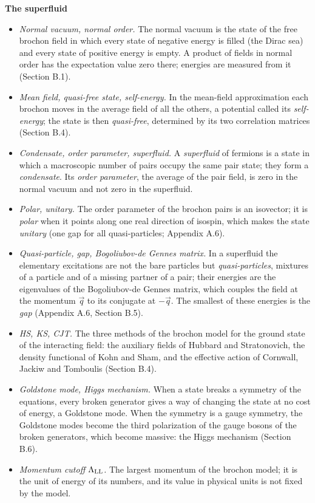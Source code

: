 \documentclass[
  10pt,
]{article}
\providecommand{\tightlist}{%
  \setlength{\itemsep}{0pt}\setlength{\parskip}{0pt}}
\begin{document}
\textbf{The superfluid}

\begin{itemize}
\tightlist
\item
  \emph{Normal vacuum, normal order.} The normal vacuum is the state of
  the free brochon field in which every state of negative energy is
  filled (the Dirac sea) and every state of positive energy is empty. A
  product of fields in normal order has the expectation value zero
  there; energies are measured from it (Section B.1).
\item
  \emph{Mean field, quasi-free state, self-energy.} In the mean-field
  approximation each brochon moves in the average field of all the
  others, a potential called its \emph{self-energy}; the state is then
  \emph{quasi-free}, determined by its two correlation matrices (Section
  B.4).
\item
  \emph{Condensate, order parameter, superfluid.} A \emph{superfluid} of
  fermions is a state in which a macroscopic number of pairs occupy the
  same pair state; they form a \emph{condensate}. Its \emph{order
  parameter}, the average of the pair field, is zero in the normal
  vacuum and not zero in the superfluid.
\item
  \emph{Polar, unitary.} The order parameter of the brochon pairs is an
  isovector; it is \emph{polar} when it points along one real direction
  of isospin, which makes the state \emph{unitary} (one gap for all
  quasi-particles; Appendix A.6).
\item
  \emph{Quasi-particle, gap, Bogoliubov-de Gennes matrix.} In a
  superfluid the elementary excitations are not the bare particles but
  \emph{quasi-particles}, mixtures of a particle and of a missing
  partner of a pair; their energies are the eigenvalues of the
  Bogoliubov-de Gennes matrix, which couples the field at the momentum
  \(\vec q\) to its conjugate at \(-\vec q\). The smallest of these
  energies is the \emph{gap} (Appendix A.6, Section B.5).
\item
  \emph{HS, KS, CJT.} The three methods of the brochon model for the
  ground state of the interacting field: the auxiliary fields of Hubbard
  and Stratonovich, the density functional of Kohn and Sham, and the
  effective action of Cornwall, Jackiw and Tomboulis (Section B.4).
\item
  \emph{Goldstone mode, Higgs mechanism.} When a state breaks a symmetry
  of the equations, every broken generator gives a way of changing the
  state at no cost of energy, a Goldstone mode. When the symmetry is a
  gauge symmetry, the Goldstone modes become the third polarization of
  the gauge bosons of the broken generators, which become massive: the
  Higgs mechanism (Section B.6).
\item
  \emph{Momentum cutoff \(\Lambda_{\rm LL}\).} The largest momentum of
  the brochon model; it is the unit of energy of its numbers, and its
  value in physical units is not fixed by the model.
\end{itemize}
\end{document}
